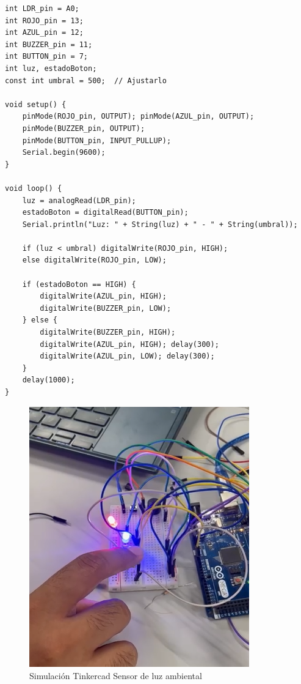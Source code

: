 \documentclass{article}
\begin{document}
\begin{lstlisting}[style=cppstyle, caption={Código en C++ para el sensor ambiental.}, label={code:sensor_ambiental}]
int LDR_pin = A0;
int ROJO_pin = 13;
int AZUL_pin = 12;
int BUZZER_pin = 11;
int BUTTON_pin = 7;
int luz, estadoBoton;
const int umbral = 500;  // Ajustarlo

void setup() {
    pinMode(ROJO_pin, OUTPUT); pinMode(AZUL_pin, OUTPUT);
    pinMode(BUZZER_pin, OUTPUT);
    pinMode(BUTTON_pin, INPUT_PULLUP);
    Serial.begin(9600);
}

void loop() {
    luz = analogRead(LDR_pin);
    estadoBoton = digitalRead(BUTTON_pin);
    Serial.println("Luz: " + String(luz) + " - " + String(umbral));
    
    if (luz < umbral) digitalWrite(ROJO_pin, HIGH);
    else digitalWrite(ROJO_pin, LOW);
    
    if (estadoBoton == HIGH) {
        digitalWrite(AZUL_pin, HIGH);
        digitalWrite(BUZZER_pin, LOW);
    } else {
        digitalWrite(BUZZER_pin, HIGH);
        digitalWrite(AZUL_pin, HIGH); delay(300);
        digitalWrite(AZUL_pin, LOW); delay(300);
    }
    delay(1000);
}    
\end{lstlisting}

\begin{figure}[H]
    \centering
    \includegraphics[width=0.85\textwidth]{img/sensores_chkp_2.png}
    \caption{Simulación Tinkercad Sensor de luz ambiental}
    \label{fig:luz_ambiental}
\end{figure}
\end{document}
